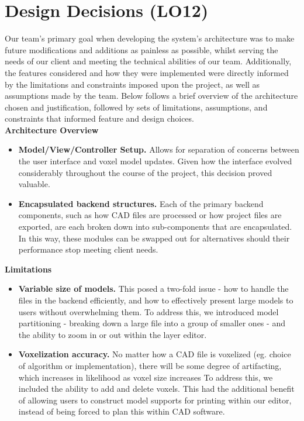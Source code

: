 \documentclass[12pt, titlepage]{article}
\begin{document}
\section{Design Decisions (LO12)}

Our team's primary goal when developing the system's architecture was to make future
modifications and additions as painless as possible, whilst serving the needs of our
client and meeting the technical abilities of our team. Additionally, the features
considered and how they were implemented were directly informed by the limitations and 
constraints imposed upon the project, as well as assumptions made by the team.
Below follows a brief overview of the architecture chosen and justification, followed by 
sets of limitations, assumptions, and constraints that informed feature and design choices.\\

\noindent\textbf{Architecture Overview}
\begin{itemize}
  \item\textbf{Model/View/Controller Setup.} Allows for separation of concerns between the
  user interface and voxel model updates. Given how the interface evolved considerably
  throughout the course of the project, this decision proved valuable.
  \item\textbf{Encapsulated backend structures.} Each of the primary backend components, such as
  how CAD files are processed or how project files are exported, are each broken down into
  sub-components that are encapsulated. In this way, these modules can be swapped out for alternatives
  should their performance stop meeting client needs.
\end{itemize}

\noindent\textbf{Limitations}
\begin{itemize}
  \item\textbf{Variable size of models.} This posed a two-fold issue - how to handle the files in 
  the backend efficiently, and how to effectively present large models to users without overwhelming
  them. To address this, we introduced model partitioning - breaking down a large file into a group of
  smaller ones - and the ability to zoom in or out within the layer editor.
  \item\textbf{Voxelization accuracy.} No matter how a CAD file is voxelized (eg. choice of algorithm 
  or implementation), there will be some degree of artifacting, which increases in likelihood as voxel
  size increases To address this, we included the ability to add and delete voxels. This had the additional
  benefit of allowing users to construct model supports for printing within our editor, instead of being
  forced to plan this within CAD software.
\end{itemize}
\end{document}
